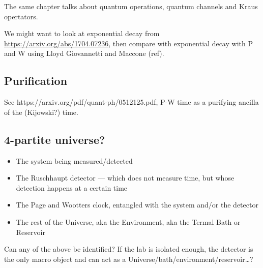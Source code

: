 The same chapter talks about quantum operations, quantum channels and Kraus opertators.

We might want to look at exponential decay from \url{https://arxiv.org/abs/1704.07236},
then compare with exponential decay with P and W using Lloyd Giovannetti and Maccone (ref).

\subsection{Purification}

See https://arxiv.org/pdf/quant-ph/0512125.pdf, P-W time as a purifying ancilla
of the (Kijowski?) time.

\subsection{4-partite universe?}
\begin{itemize}
  \item{The system being measured/detected}
  \item{The Ruschhaupt detector --- which does not measure time, but whose detection happens at a certain time}
  \item{The Page and Wootters clock, entangled with the system and/or the detector}
  \item{The rest of the Universe, aka the Environment, aka the Termal Bath or Reservoir}
\end{itemize}

Can any of the above be identified? If the lab is isolated enough,
the detector is the only macro object and can act as a Universe/bath/environment/reservoir\dots?
